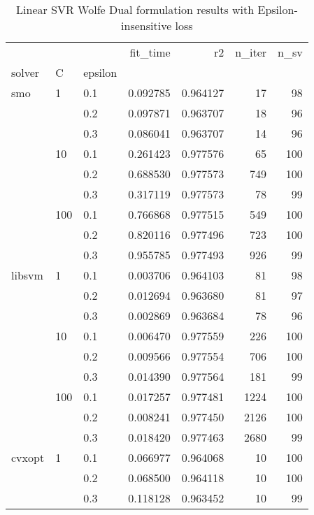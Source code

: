 \begin{table}[H]
\centering
\caption{Linear SVR Wolfe Dual formulation results with Epsilon-insensitive loss}
\label{linear_dual_l1_svr_cv_results}
\begin{tabular}{lllrrrr}
\toprule
       &     &     &  fit\_time &        r2 &  n\_iter &  n\_sv \\
solver & C & epsilon &           &           &         &       \\
\midrule
smo & 1   & 0.1 &  0.092785 &  0.964127 &      17 &    98 \\
       &     & 0.2 &  0.097871 &  0.963707 &      18 &    96 \\
       &     & 0.3 &  0.086041 &  0.963707 &      14 &    96 \\
       & 10  & 0.1 &  0.261423 &  0.977576 &      65 &   100 \\
       &     & 0.2 &  0.688530 &  0.977573 &     749 &   100 \\
       &     & 0.3 &  0.317119 &  0.977573 &      78 &    99 \\
       & 100 & 0.1 &  0.766868 &  0.977515 &     549 &   100 \\
       &     & 0.2 &  0.820116 &  0.977496 &     723 &   100 \\
       &     & 0.3 &  0.955785 &  0.977493 &     926 &    99 \\
libsvm & 1   & 0.1 &  0.003706 &  0.964103 &      81 &    98 \\
       &     & 0.2 &  0.012694 &  0.963680 &      81 &    97 \\
       &     & 0.3 &  0.002869 &  0.963684 &      78 &    96 \\
       & 10  & 0.1 &  0.006470 &  0.977559 &     226 &   100 \\
       &     & 0.2 &  0.009566 &  0.977554 &     706 &   100 \\
       &     & 0.3 &  0.014390 &  0.977564 &     181 &    99 \\
       & 100 & 0.1 &  0.017257 &  0.977481 &    1224 &   100 \\
       &     & 0.2 &  0.008241 &  0.977450 &    2126 &   100 \\
       &     & 0.3 &  0.018420 &  0.977463 &    2680 &    99 \\
cvxopt & 1   & 0.1 &  0.066977 &  0.964068 &      10 &   100 \\
       &     & 0.2 &  0.068500 &  0.964118 &      10 &   100 \\
       &     & 0.3 &  0.118128 &  0.963452 &      10 &    99 \\

\end{tabular}
\end{table}
